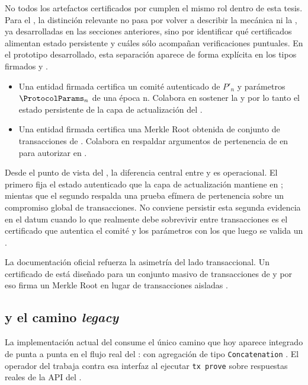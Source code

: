 
No todos los artefactos certificados por \Mithril cumplen el mismo rol dentro de esta tesis. Para el \zkBridge, la distinción relevante no pasa por volver a describir la mecánica \STM ni la \CertificateChain, ya desarrolladas en las secciones anteriores, sino por identificar qué certificados alimentan estado persistente y cuáles sólo acompañan verificaciones puntuales. En el prototipo desarrollado, esta separación aparece de forma explícita en los tipos firmados \MithrilStakeDistribution y \CardanoTransactions.

\begin{itemize}[noitemsep]
	\item Una entidad firmada \MithrilStakeDistribution certifica un comité autenticado de \Mithril $P'_n$ y parámetros $\ProtocolParams_n$ de una época n. Colabora en sostener la \CertificateChain y por lo tanto el estado persistente de la capa de actualización del \zkBridge.
	\item Una entidad firmada \CardanoTransactions certifica una Merkle Root obtenida de conjunto de transacciones de \Cardano. Colabora en respaldar argumentos de pertenencia de \LockTx en \ChainA para autorizar \MintTx en \ChainB.
\end{itemize}

Desde el punto de vista del \zkBridge, la diferencia central entre \MithrilStakeDistribution y \CardanoTransactions es operacional. El primero fija el estado autenticado que la capa de actualización mantiene en \ChainB; mientas que el segundo respalda una prueba efímera de pertenencia sobre un compromiso global de transacciones. No conviene persistir esta segunda evidencia en el datum cuando lo que realmente debe sobrevivir entre transacciones es el certificado que autentica el comité y los parámetros con los que luego se valida un \TransactionSnapshotCertificate.

La documentación oficial refuerza la asimetría del lado transaccional. Un certificado de \CardanoTransactions está diseñado para un conjunto masivo de transacciones de \Cardano y por eso firma un Merkle Root en lugar de transacciones aisladas \cite{MithrilDocsTransactions}.

\subsection{\Pythagoras y el camino \textit{legacy}}

La implementación actual del \zkBridge consume el único camino que hoy aparece integrado de punta a punta en el flujo real del \MithrilAggregator: \Pythagoras con agregación de tipo \texttt{Concatenation} \cite{MithrilDocsAggregator}. El operador del \zkBridge trabaja contra esa interfaz al ejecutar \texttt{tx prove} sobre respuestas reales de la API del \MithrilAggregator.

